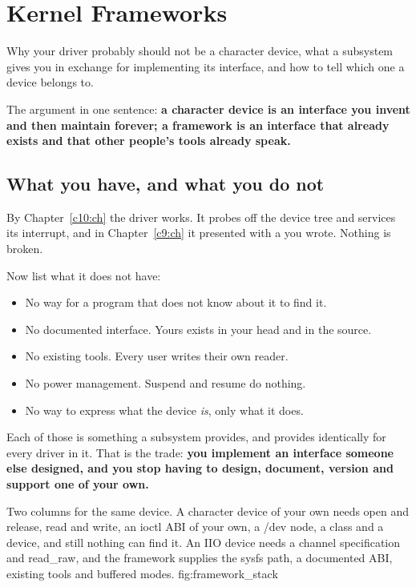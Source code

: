 
\section{Kernel Frameworks}
\label{c11:app:a}

Why your driver probably should not be a character device, what a subsystem gives you in exchange
for implementing its interface, and how to tell which one a device belongs to.

The argument in one sentence: \textbf{a character device is an interface you invent and then
maintain forever; a framework is an interface that already exists and that other people's tools
already speak.}

\subsection{What you have, and what you do not}
\label{c11:app:a1}

By Chapter~\ref{c10:ch} the driver works. It probes off the device tree and services its
interrupt, and in Chapter~\ref{c9:ch} it presented  with a  you
wrote. Nothing is broken.

Now list what it does not have:
\begin{itemize}
  \item No way for a program that does not know about it to find it.
  \item No documented interface. Yours exists in your head and in the source.
  \item No existing tools. Every user writes their own reader.
  \item No power management. Suspend and resume do nothing.
  \item No way to express what the device \emph{is}, only what it does.
\end{itemize}
Each of those is something a subsystem provides, and provides identically for every driver in it.
That is the trade: \textbf{you implement an interface someone else designed, and you stop having to
design, document, version and support one of your own.}

  {Two columns for the same device. A character device of your own needs open and release, read and
   write, an ioctl ABI of your own, a /dev node, a class and a device, and still nothing can find
   it. An IIO device needs a channel specification and read\_raw, and the framework supplies the
   sysfs path, a documented ABI, existing tools and buffered modes.}
  {fig:framework_stack}

